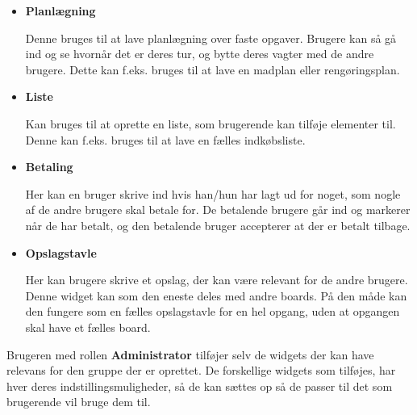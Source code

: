 \begin{itemize}
\item  \textbf{Planlægning}

Denne bruges til at lave planlægning over faste opgaver. Brugere kan så gå ind og se hvornår det er deres tur, og bytte deres vagter med de andre brugere. Dette kan f.eks. bruges til at lave en madplan eller rengøringsplan.
\end{itemize}

\begin{itemize}
\item  \textbf{Liste}

\noindent Kan bruges til at oprette en liste, som brugerende kan tilføje elementer til. Denne kan f.eks. bruges til at lave en fælles indkøbsliste.
\end{itemize}

\begin{itemize}
\item  \textbf{Betaling}

\noindent Her kan en bruger skrive ind hvis han/hun har lagt ud for noget, som nogle af de andre brugere skal betale for. De betalende brugere går ind og markerer når de har betalt, og den betalende bruger accepterer at der er betalt tilbage.
\end{itemize}

\begin{itemize}
\item  \textbf{Opslagstavle}

\noindent Her kan brugere skrive et opslag, der kan være relevant for de andre brugere. Denne widget kan som den eneste deles med andre boards. På den måde kan den fungere som en fælles opslagstavle for en hel opgang, uden at opgangen skal have et fælles board.
\end{itemize}
\noindent Brugeren med rollen \textbf{Administrator} tilføjer selv de widgets der kan have relevans for den gruppe der er oprettet. De forskellige widgets som tilføjes, har hver deres indstillingsmuligheder, så de kan sættes op så de passer til det som brugerende vil bruge dem til. 

